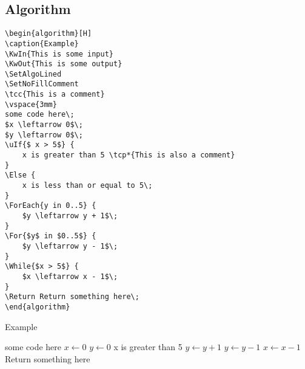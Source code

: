 \documentclass[a4paper]{report}
\begin{document}
\subsection*{Algorithm}
\begin{verbatim}
\begin{algorithm}[H]
\caption{Example}
\KwIn{This is some input}
\KwOut{This is some output}
\SetAlgoLined
\SetNoFillComment
\tcc{This is a comment}
\vspace{3mm}
some code here\;
$x \leftarrow 0$\;
$y \leftarrow 0$\;
\uIf{$ x > 5$} {
    x is greater than 5 \tcp*{This is also a comment}
}
\Else {
    x is less than or equal to 5\;
}
\ForEach{y in 0..5} {
    $y \leftarrow y + 1$\;
}
\For{$y$ in $0..5$} {
    $y \leftarrow y - 1$\;
}
\While{$x > 5$} {
    $x \leftarrow x - 1$\;
}
\Return Return something here\;
\end{algorithm}
\end{verbatim}
\begin{algorithm}[H]
\caption{Example}
\SetAlgoLined
\SetNoFillComment
{}
\vspace{3mm}
some code here\;
$x \leftarrow 0$\;
$y \leftarrow 0$\;
 {
    x is greater than 5 
}
 {
    $y \leftarrow y + 1$\;
}
 {
    $y \leftarrow y - 1$\;
}
 {
    $x \leftarrow x - 1$\;
}
\Return Return something here\;
\end{algorithm}
\end{document}
